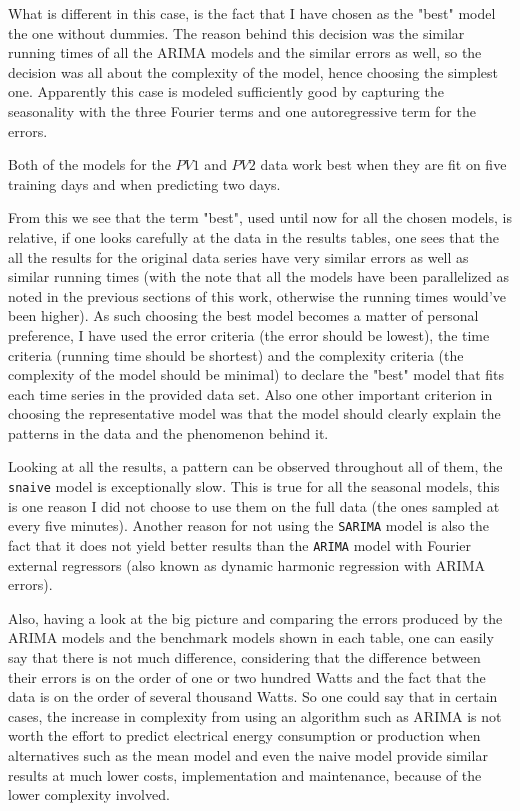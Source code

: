 \documentclass[12pt,a4paper,titlepage]{report}
\begin{document}
What is different in this case, is the fact that I have chosen as the "best" model the one without dummies. The reason behind this decision was the similar running times of all the ARIMA models and the similar errors as well, so the decision was all about the complexity of the model, hence choosing the simplest one. Apparently this case is modeled sufficiently good by capturing the seasonality with the three Fourier terms and one autoregressive term for the errors.

Both of the models for the $ PV1 $ and $ PV2 $ data work best when they are fit on five training days and when predicting two days.

From this we see that the term "best", used until now for all the chosen models, is relative, if one looks carefully at the data in the results tables, one sees that the all the results for the original data series have very similar errors as well as similar running times (with the note that all the models have been parallelized as noted in the previous sections of this work, otherwise the running times would've been higher). As such choosing the best model becomes a matter of personal preference, I have used the error criteria (the error should be lowest), the time criteria (running time should be shortest) and the complexity criteria (the complexity of the model should be minimal) to declare the "best" model that fits each time series in the provided data set. Also one other important criterion in choosing the representative model was that the model should clearly explain the patterns in the data and the phenomenon behind it.

Looking at all the results, a pattern can be observed throughout all of them, the \texttt{snaive} model is exceptionally slow. This is true for all the seasonal models, this is one reason I did not choose to use them on the full data (the ones sampled at every five minutes). Another reason for not using the \texttt{SARIMA} model is also the fact that it does not yield better results than the \texttt{ARIMA} model with Fourier external regressors (also known as dynamic harmonic regression with ARIMA errors).

Also, having a look at the big picture and comparing the errors produced by the ARIMA models and the benchmark models shown in each table, one can easily say that there is not much difference, considering that the difference between their errors is on the order of one or two hundred Watts and the fact that the data is on the order of several thousand Watts. So one could say that in certain cases, the increase in complexity from using an algorithm such as ARIMA is not worth the effort to predict electrical energy consumption or production when alternatives such as the mean model and even the naive model provide similar results at much lower costs, implementation and maintenance, because of the lower complexity involved.
\end{document}
